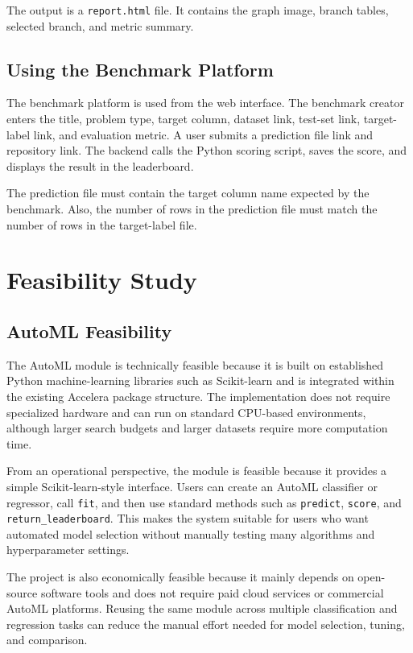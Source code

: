 \documentclass[12pt,a4paper]{report}
\begin{document}
The output is a \texttt{report.html} file. It contains the graph image, branch
tables, selected branch, and metric summary.

\section{Using the Benchmark Platform}
The benchmark platform is used from the web interface. The benchmark creator
enters the title, problem type, target column, dataset link, test-set link,
target-label link, and evaluation metric. A user submits a prediction file link
and repository link. The backend calls the Python scoring script, saves the
score, and displays the result in the leaderboard.

The prediction file must contain the target column name expected by the
benchmark. Also, the number of rows in the prediction file must match the
number of rows in the target-label file.

\iffalse
\chapter{Feasibility Study}

\section{AutoML Feasibility}
The AutoML module is technically feasible because it is built on established
Python machine-learning libraries such as Scikit-learn and is integrated within
the existing Accelera package structure. The implementation does not require
specialized hardware and can run on standard CPU-based environments, although
larger search budgets and larger datasets require more computation time.

\noindent From an operational perspective, the module is feasible because it
provides a simple Scikit-learn-style interface. Users can create an AutoML
classifier or regressor, call \texttt{fit}, and then use standard methods such
as \texttt{predict}, \texttt{score}, and \texttt{return\_leaderboard}. This
makes the system suitable for users who want automated model selection without
manually testing many algorithms and hyperparameter settings.

\noindent The project is also economically feasible because it mainly depends on
open-source software tools and does not require paid cloud services or
commercial AutoML platforms. Reusing the same module across multiple
classification and regression tasks can reduce the manual effort needed for
model selection, tuning, and comparison.
\end{document}
